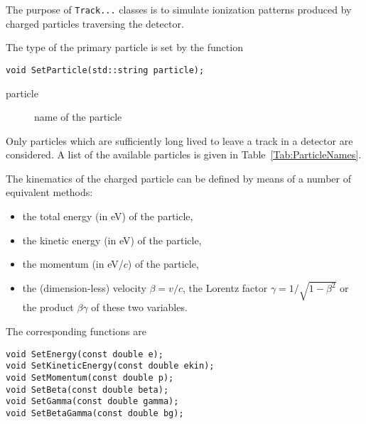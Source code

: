 The purpose of \texttt{Track...} classes is to simulate  
ionization patterns produced by charged particles traversing the detector. 

The type of the primary particle is set by the function
\begin{lstlisting}
void SetParticle(std::string particle);
\end{lstlisting}
\begin{description}
  \item[particle]
  name of the particle 
\end{description}
Only particles which are sufficiently long lived to leave a 
track in a detector are considered.
A list of the available particles is given 
in Table~\ref{Tab:ParticleNames}.

The kinematics of the charged particle can be defined 
by means of a number of equivalent methods:
  \begin{itemize}
    \item
    the total energy (in eV) of the particle,
    \item
    the kinetic energy (in eV) of the particle,
    \item
    the momentum (in eV/\(c\)) of the particle,
    \item
    the (dimension-less) velocity \(\beta = v / c\), 
    the Lorentz factor \(\gamma = 1 / \sqrt{1 - \beta^2}\) 
    or the product \(\beta\gamma\) of these two variables.
  \end{itemize}
The corresponding functions are
\begin{lstlisting}
void SetEnergy(const double e);
void SetKineticEnergy(const double ekin);
void SetMomentum(const double p);
void SetBeta(const double beta);
void SetGamma(const double gamma);
void SetBetaGamma(const double bg);
\end{lstlisting}

